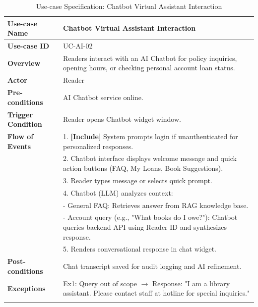 \newpage
\begin{longtable}{|p{3.5cm}|p{11.5cm}|}
    \hline
    \textbf{Use-case Name} & \textbf{Chatbot Virtual Assistant Interaction} \\
    \hline
    \textbf{Use-case ID} & UC-AI-02 \\
    \hline
    \textbf{Overview} & Readers interact with an AI Chatbot for policy inquiries, opening hours, or checking personal account loan status. \\
    \hline
    \textbf{Actor} & Reader \\
    \hline
    \textbf{Pre-conditions} & AI Chatbot service online. \\
    \hline
    \textbf{Trigger Condition} & Reader opens Chatbot widget window. \\
    \hline
    \textbf{Flow of Events} & 
    1. \textbf{[Include]} System prompts login if unauthenticated for personalized responses.\\ 
 & 
    2. Chatbot interface displays welcome message and quick action buttons (FAQ, My Loans, Book Suggestions).\\ 
 & 
    3. Reader types message or selects quick prompt.\\ 
 & 
    4. Chatbot (LLM) analyzes context:\\ 
 & 
    - General FAQ: Retrieves answer from RAG knowledge base.\\ 
 & 
    - Account query (e.g., "What books do I owe?"): Chatbot queries backend API using Reader ID and synthesizes response.\\ 
 & 
    5. Renders conversational response in chat widget. \\
    \hline
    \textbf{Post-conditions} & Chat transcript saved for audit logging and AI refinement. \\
    \hline
    \textbf{Exceptions} & 
    Ex1: Query out of scope $\rightarrow$ Response: "I am a library assistant. Please contact staff at hotline for special inquiries." \\
    \hline
    \caption{Use-case Specification: Chatbot Virtual Assistant Interaction} \\
\end{longtable}



